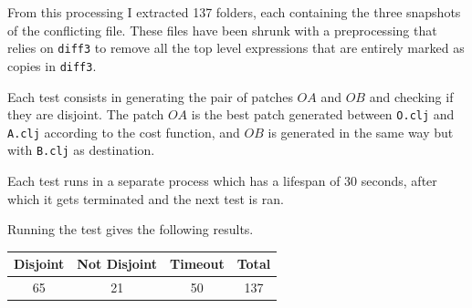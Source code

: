 \documentclass[11pt]{article}
\begin{document}
From this processing I extracted 137 folders, each containing the three snapshots 
of the conflicting file. These files have been shrunk with a preprocessing that 
relies on \texttt{diff3} to remove all the top level expressions that are 
entirely marked as copies in \texttt{diff3}. 

Each test consists in generating the pair of patches $OA$ and $OB$ and checking if they are disjoint. 
The patch $OA$ is the best patch generated between \texttt{O.clj} and \texttt{A.clj} according 
to the cost function, and $OB$ is generated in the same way but with \texttt{B.clj} 
as destination.

Each test runs in a separate process which has a lifespan of 30 seconds, after 
which it gets terminated and the next test is ran. 

Running the test gives the following results.

\begin{center}
 \begin{tabular} { ||c|c|c|c|| }
   \hline Disjoint & Not Disjoint & Timeout & Total \\
   \hline
   \hline 65 & 21 & 50 & 137 \\
    \hline
 \end{tabular}
\end{center}



%
\end{document}
